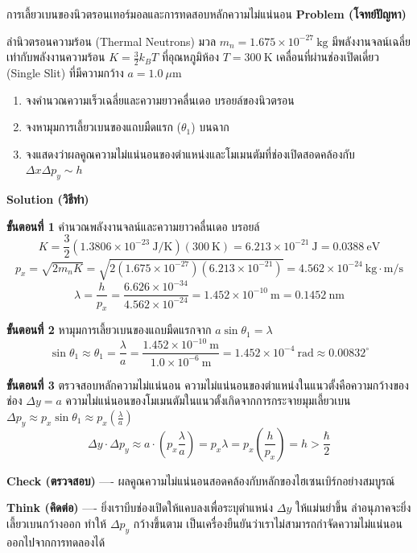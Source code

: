 \begin{psctbox}{การเลี้ยวเบนของนิวตรอนเทอร์มอลและการทดสอบหลักความไม่แน่นอน}
\textbf{Problem (โจทย์ปัญหา)}

ลำนิวตรอนความร้อน (Thermal Neutrons) มวล $m_n = 1.675 \times 10^{-27}~\text{kg}$ มีพลังงานจลน์เฉลี่ยเท่ากับพลังงานความร้อน $K = \frac{3}{2}k_B T$ ที่อุณหภูมิห้อง $T = 300~\text{K}$ เคลื่อนที่ผ่านช่องเปิดเดี่ยว (Single Slit) ที่มีความกว้าง $a = 1.0~\mu\text{m}$
\begin{enumerate}
    \item จงคำนวณความเร็วเฉลี่ยและความยาวคลื่นเดอ บรอยล์ของนิวตรอน
    \item จงหามุมการเลี้ยวเบนของแถบมืดแรก ($\theta_1$) บนฉาก
    \item จงแสดงว่าผลคูณความไม่แน่นอนของตำแหน่งและโมเมนตัมที่ช่องเปิดสอดคล้องกับ $\Delta x \Delta p_y \sim h$
\end{enumerate}

\textbf{Solution (วิธีทำ)}

\textbf{ขั้นตอนที่ 1} คำนวณพลังงานจลน์และความยาวคลื่นเดอ บรอยล์
\begin{equation*}
K = \frac{3}{2}(1.3806 \times 10^{-23}~\text{J/K})(300~\text{K}) = 6.213 \times 10^{-21}~\text{J} = 0.0388~\text{eV}
\end{equation*}
\begin{equation*}
p_x = \sqrt{2 m_n K} = \sqrt{2(1.675 \times 10^{-27})(6.213 \times 10^{-21})} = 4.562 \times 10^{-24}~\text{kg}\cdot\text{m/s}
\end{equation*}
\begin{equation*}
\lambda = \frac{h}{p_x} = \frac{6.626 \times 10^{-34}}{4.562 \times 10^{-24}} = 1.452 \times 10^{-10}~\text{m} = 0.1452~\text{nm}
\end{equation*}

\textbf{ขั้นตอนที่ 2} หามุมการเลี้ยวเบนของแถบมืดแรกจาก $a \sin\theta_1 = \lambda$
\begin{equation*}
\sin\theta_1 \approx \theta_1 = \frac{\lambda}{a} = \frac{1.452 \times 10^{-10}~\text{m}}{1.0 \times 10^{-6}~\text{m}} = 1.452 \times 10^{-4}~\text{rad} \approx 0.00832^\circ
\end{equation*}

\textbf{ขั้นตอนที่ 3} ตรวจสอบหลักความไม่แน่นอน
ความไม่แน่นอนของตำแหน่งในแนวตั้งคือความกว้างของช่อง $\Delta y = a$
ความไม่แน่นอนของโมเมนตัมในแนวตั้งเกิดจากการกระจายมุมเลี้ยวเบน $\Delta p_y \approx p_x \sin\theta_1 \approx p_x \left(\frac{\lambda}{a}\right)$
\begin{equation*}
\Delta y \cdot \Delta p_y \approx a \cdot \left( p_x \frac{\lambda}{a} \right) = p_x \lambda = p_x \left( \frac{h}{p_x} \right) = h > \frac{\hbar}{2}
\end{equation*}

\textbf{Check (ตรวจสอบ)} ---- ผลคูณความไม่แน่นอนสอดคล้องกับหลักของไฮเซนเบิร์กอย่างสมบูรณ์

\textbf{Think (คิดต่อ)} ---- ยิ่งเราบีบช่องเปิดให้แคบลงเพื่อระบุตำแหน่ง $\Delta y$ ให้แม่นยำขึ้น ลำอนุภาคจะยิ่งเลี้ยวเบนกว้างออก ทำให้ $\Delta p_y$ กว้างขึ้นตาม เป็นเครื่องยืนยันว่าเราไม่สามารถกำจัดความไม่แน่นอนออกไปจากการทดลองได้
\end{psctbox}

